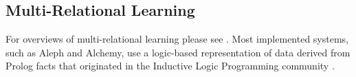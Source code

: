 
\subsection{Multi-Relational Learning} 
For overviews of multi-relational learning please see \cite{Domingos2009,SRL2007,Kimmig2015}. 
Most implemented systems, such as Aleph and Alchemy, use a logic-based representation of data derived from Prolog facts that originated in the Inductive Logic Programming community \cite{Dzeroski2001c}. 

